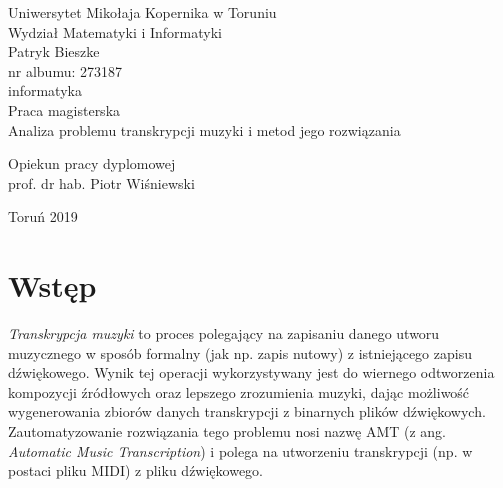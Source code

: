 \documentclass[12pt,a4paper,twoside]{mwart}
\begin{document}
\begin{titlepage}
	\begin{center}
		\large Uniwersytet Mikołaja Kopernika w Toruniu\\
		\large Wydział Matematyki i Informatyki\\
		\vspace{3cm} 
		\large Patryk Bieszke\\
			nr albumu: 273187\\
			informatyka\\
		\vspace{2cm}
		Praca magisterska\\
	
		\vspace{2cm} 
		\huge Analiza problemu transkrypcji muzyki i metod jego rozwiązania\\
	\end{center}
	\hfill
	\begin{minipage}{6cm}
		\vspace{2cm}
		Opiekun pracy dyplomowej\\
		prof. dr hab. Piotr Wiśniewski
	\end{minipage}
	\vspace{3cm}
	\begin{center}
		Toruń 2019\\
	\end{center}
\end{titlepage}



\clearpage
\thispagestyle{empty}
\mbox{}

\tableofcontents

\clearpage

\setcounter{secnumdepth}{0}
\section{Wstęp}\label{sec:wstep}
\textit{Transkrypcja muzyki} to proces polegający na zapisaniu danego utworu muzycznego w sposób formalny (jak np. zapis nutowy) z istniejącego zapisu dźwiękowego. Wynik tej operacji wykorzystywany jest do wiernego odtworzenia kompozycji źródłowych oraz lepszego zrozumienia muzyki, dając możliwość wygenerowania zbiorów danych transkrypcji z binarnych plików dźwiękowych. Zautomatyzowanie rozwiązania tego problemu nosi nazwę AMT (z ang. \textit{Automatic Music Transcription}) i polega na utworzeniu transkrypcji (np. w postaci pliku MIDI) z pliku dźwiękowego.
\end{document}
